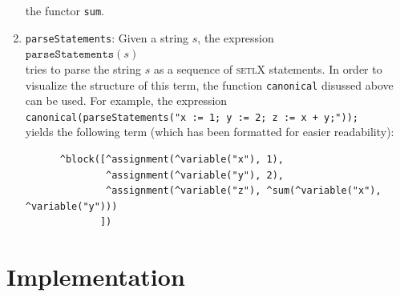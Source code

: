 \documentclass[11pt]{report}
\begin{document}
\begin{enumerate}
      the functor \texttt{sum}.
\item \texttt{parseStatements}:  Given a string $s$, the expression
      \\[0.2cm]
      \hspace*{1.3cm}
      $\mathtt{parseStatements}(s)$ 
      \\[0.2cm]
      tries to parse the string $s$ as a sequence of \textsc{setlX} statements.   In order to visualize the structure of
      this term,  the function \texttt{canonical} disussed above can be used.  For
      example, the expression
      \\[0.2cm]
      \hspace*{1.3cm}
      \texttt{canonical(parseStatements("x := 1; y := 2; z := x + y;"));}
      \\[0.2cm]
      yields the following term (which has been formatted for easier readability):
\begin{verbatim}
      ^block([^assignment(^variable("x"), 1), 
              ^assignment(^variable("y"), 2), 
              ^assignment(^variable("z"), ^sum(^variable("x"), ^variable("y")))
             ])
\end{verbatim}
\end{enumerate}

\chapter{Implementation}
\end{document}
